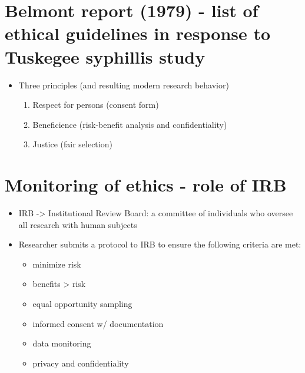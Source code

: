 \documentclass[11pt]{article}
\begin{document}
\section*{Belmont report (1979) - list of ethical guidelines in response to Tuskegee syphillis study}
\label{sec-4}
\begin{itemize}
\item Three principles (and resulting modern research behavior)
\begin{enumerate}
\item Respect for persons (consent form)
\item Beneficience (risk-benefit analysis and confidentiality)
\item Justice (fair selection)
\end{enumerate}
\end{itemize}
\section*{Monitoring of ethics - role of IRB}
\label{sec-5}
\begin{itemize}
\item IRB -> Institutional Review Board: a committee of individuals who oversee all research with human subjects
\item Researcher submits a protocol to IRB to ensure the following criteria are met:
\begin{itemize}
\item minimize risk
\item benefits > risk
\item equal opportunity sampling
\item informed consent w/ documentation
\item data monitoring
\item privacy and confidentiality
\end{itemize}
\end{itemize}
\end{document}
